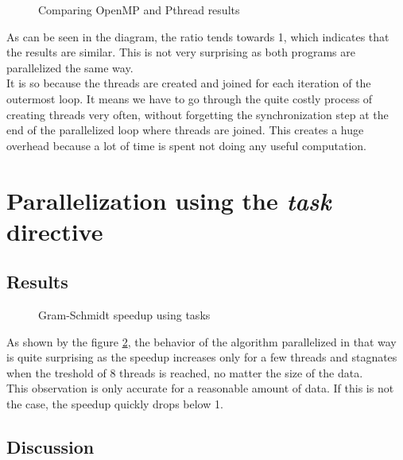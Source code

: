 \begin{figure}[ht]
  \begin{center}
  \end{center}
  \caption{Comparing OpenMP and Pthread results}
  \label{fig:gram_pthread}
\end{figure} 

As can be seen in the diagram, the ratio tends towards 1, which indicates that the results are similar. This is not very surprising as both programs are parallelized the same way.\\

It is so because the threads are created and joined for each iteration of the outermost loop. It means we have to go through the quite costly process of creating threads very often, without forgetting the synchronization step at the end of the parallelized loop where threads are joined. This creates a huge overhead because a lot of time is spent not doing any useful computation.

\section{Parallelization using the \textit{task} directive}

\subsection{Results}

\begin{figure}[ht]
  \begin{center}
  \end{center}
  \caption{Gram-Schmidt speedup using tasks}
  \label{fig:gram_speedup_task}
\end{figure} 

As shown by the figure \ref{fig:gram_speedup_task}, the behavior of the algorithm parallelized in that way is quite surprising as the speedup increases only for a few threads and stagnates when the treshold of 8 threads is reached, no matter the size of the data.\\

This observation is only accurate for a reasonable amount of data. If this is not the case, the speedup quickly drops below 1.\\

\subsection{Discussion}

